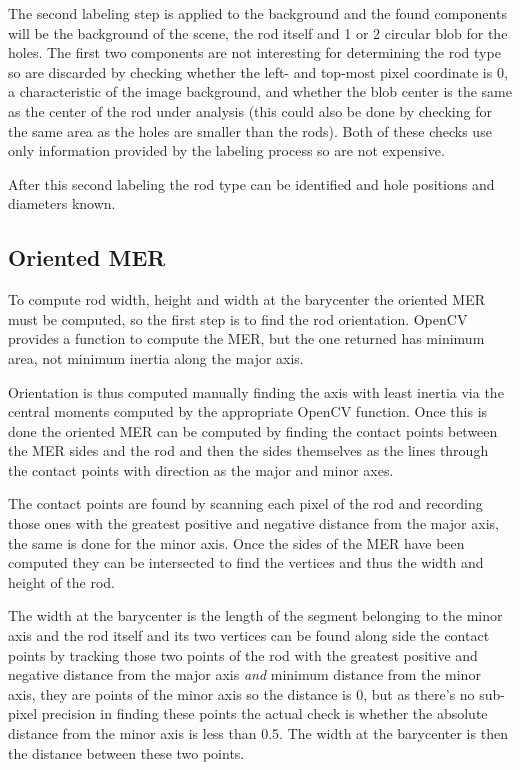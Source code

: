 The second labeling step is applied to the background and the found components will be the background of the scene, the rod itself and 1 or 2 circular blob for the holes.
The first two components are not interesting for determining the rod type so are discarded by checking whether the left- and top-most pixel coordinate is 0, a characteristic of the image background, and whether the blob center is the same as the center of the rod under analysis (this could also be done by checking for the same area as the holes are smaller than the rods).
Both of these checks use only information provided by the labeling process so are not expensive.

After this second labeling the rod type can be identified and hole positions and diameters known.

\subsection{Oriented MER}
To compute rod width, height and width at the barycenter the oriented MER must be computed, so the first step is to find the rod orientation.
OpenCV provides a function to compute the MER, but the one returned has minimum area, not minimum inertia along the major axis.

Orientation is thus computed manually finding the axis with least inertia via the central moments computed by the appropriate OpenCV function.
Once this is done the oriented MER can be computed by finding the contact points between the MER sides and the rod and then the sides themselves as the lines through the contact points with direction as the major and minor axes.

The contact points are found by scanning each pixel of the rod and recording those ones with the greatest positive and negative distance from the major axis, the same is done for the minor axis.
Once the sides of the MER have been computed they can be intersected to find the vertices and thus the width and height of the rod.

The width at the barycenter is the length of the segment belonging to the minor axis and the rod itself and its two vertices can be found along side the contact points by tracking those two points of the rod with the greatest positive and negative distance from the major axis \textit{and} minimum distance from the minor axis, \ie they are points of the minor axis so the distance is 0, but as there's no sub-pixel precision in finding these points the actual check is whether the absolute distance from the minor axis is less than 0.5.
The width at the barycenter is then the distance between these two points.

